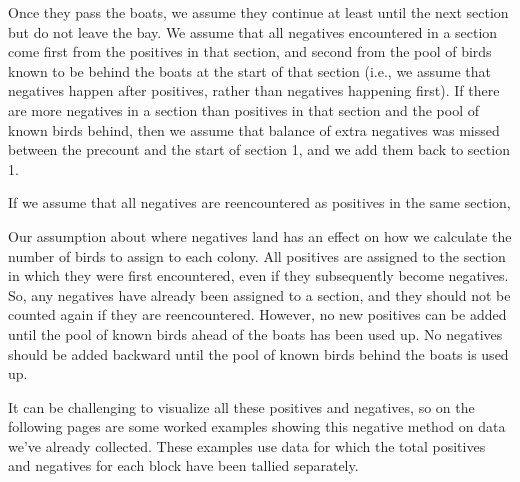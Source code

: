\documentclass[
]{article}
\begin{document}
Once they pass the boats, we assume they continue at least until the
next section but do not leave the bay. We assume that all negatives
encountered in a section come first from the positives in that section,
and second from the pool of birds known to be behind the boats at the
start of that section (i.e., we assume that negatives happen after
positives, rather than negatives happening first). If there are more
negatives in a section than positives in that section and the pool of
known birds behind, then we assume that balance of extra negatives was
missed between the precount and the start of section 1, and we add them
back to section 1.

If we assume that all negatives are reencountered as positives in the
same section,

Our assumption about where negatives land has an effect on how we
calculate the number of birds to assign to each colony. All positives
are assigned to the section in which they were first encountered, even
if they subsequently become negatives. So, any negatives have already
been assigned to a section, and they should not be counted again if they
are reencountered. However, no new positives can be added until the pool
of known birds ahead of the boats has been used up. No negatives should
be added backward until the pool of known birds behind the boats is used
up.

It can be challenging to visualize all these positives and negatives, so
on the following pages are some worked examples showing this negative
method on data we've already collected. These examples use data for
which the total positives and negatives for each block have been tallied
separately.

\newpage

\providecommand{\docline}[3]{\noalign{\global\setlength{\arrayrulewidth}{#1}}\arrayrulecolor[HTML]{#2}\cline{#3}}

\setlength{\tabcolsep}{2pt}

\renewcommand*{\arraystretch}{1.5}
\end{document}
